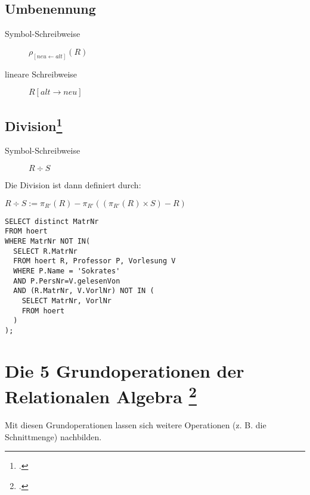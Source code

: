 \documentclass{lehramt-informatik-haupt}
\begin{document}
%

\subsection{Umbenennung}

\begin{description}
\item[Symbol-Schreibweise] $\rho_{[{neu}\leftarrow alt]} (R)$
\item[lineare Schreibweise] $R[alt\rightarrow neu]$
\end{description}

%

\subsection{Division\footcite[Division]{relationale-algebra}}

\begin{description}
\item[Symbol-Schreibweise] $R \div S$
\end{description}

Die Division ist dann definiert durch:

$R\div S:=\pi_{{R'}}(R)-\pi_{{R'}}((\pi_{{R'}}(R)\times S)-R)$

\begin{verbatim}
SELECT distinct MatrNr
FROM hoert
WHERE MatrNr NOT IN(
  SELECT R.MatrNr
  FROM hoert R, Professor P, Vorlesung V
  WHERE P.Name = 'Sokrates'
  AND P.PersNr=V.gelesenVon
  AND (R.MatrNr, V.VorlNr) NOT IN (
    SELECT MatrNr, VorlNr
    FROM hoert
  )
);
\end{verbatim}

%

\section{Die 5 Grundoperationen der Relationalen Algebra
\footcite{net:pdf:lmu:dbs}
}

Mit diesen Grundoperationen lassen sich weitere Operationen (z. B. die
Schnittmenge) nachbilden.
\end{document}
